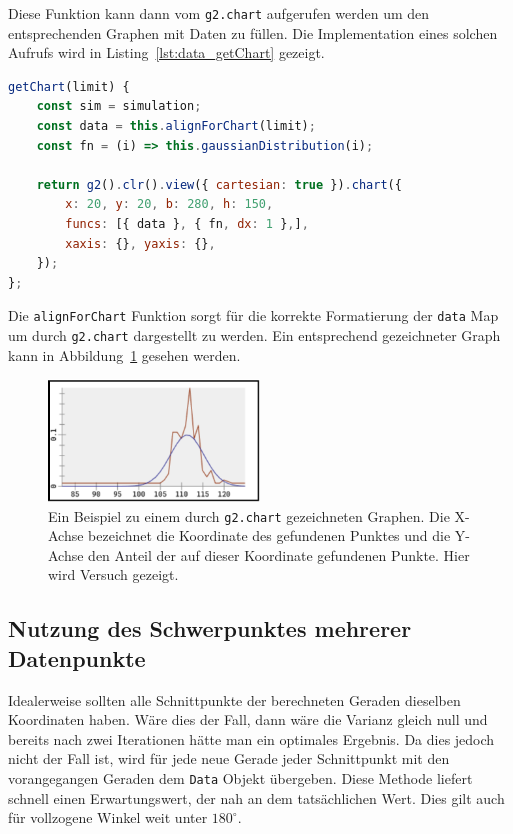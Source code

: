 Diese Funktion kann dann vom \lstinline{g2.chart} aufgerufen werden um den entsprechenden Graphen mit Daten zu füllen.
Die Implementation eines solchen Aufrufs wird in Listing~\ref{lst:data_getChart} gezeigt.

\begin{lstlisting}[language=JavaScript, caption={Definition der \lstinline{getChart} Funktion der \lstinline{Data} Klasse.}, label={lst:data_getChart}]
getChart(limit) {
    const sim = simulation;
    const data = this.alignForChart(limit);
    const fn = (i) => this.gaussianDistribution(i);

    return g2().clr().view({ cartesian: true }).chart({
        x: 20, y: 20, b: 280, h: 150,
        funcs: [{ data }, { fn, dx: 1 },],
        xaxis: {}, yaxis: {},
    });
};
\end{lstlisting}

Die \lstinline{alignForChart} Funktion sorgt für die korrekte Formatierung der \lstinline{data} Map um durch \lstinline{g2.chart} dargestellt zu werden.
Ein entsprechend gezeichneter Graph kann in Abbildung~\ref{fig:normalverteilung} gesehen werden.

\begin{figure}
    \centering
    \includegraphics[width=0.5\textwidth]{gfx/normalverteilung.png}
    \caption[Beispiel für in etwa normal verteilte Daten.]{Ein Beispiel zu einem durch \lstinline{g2.chart} gezeichneten Graphen. Die X-Achse bezeichnet die Koordinate des gefundenen Punktes und die Y-Achse den Anteil der auf dieser Koordinate gefundenen Punkte. Hier wird Versuch  gezeigt.}
    \label{fig:normalverteilung}
\end{figure}

\subsection{Nutzung des Schwerpunktes mehrerer Datenpunkte}\label{ch:nutzung_des_schwerpunktes}

Idealerweise sollten alle Schnittpunkte der berechneten Geraden dieselben Koordinaten haben.
Wäre dies der Fall, dann wäre die Varianz gleich null und bereits nach zwei Iterationen hätte man ein optimales Ergebnis.
Da dies jedoch nicht der Fall ist, wird für jede neue Gerade jeder Schnittpunkt mit den vorangegangen Geraden dem \lstinline{Data} Objekt übergeben.
Diese Methode liefert schnell einen Erwartungswert, der nah an dem tatsächlichen Wert.
Dies gilt auch für vollzogene Winkel weit unter $180^\circ$.

